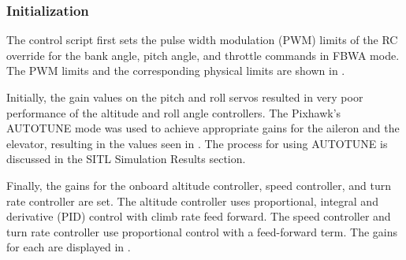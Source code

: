 \documentclass{aiaa}
\begin{document}
\subsubsection{Initialization}

The control script first sets the pulse width modulation (PWM) limits of the RC override for the bank angle, pitch angle, and throttle commands in FBWA mode. The PWM limits and the corresponding physical limits are shown in .


Initially, the gain values on the pitch and roll servos resulted in very poor performance of the altitude and roll angle controllers. The Pixhawk's AUTOTUNE mode was used to achieve appropriate gains for the aileron and the elevator, resulting in the values seen in . The process for using AUTOTUNE is discussed in the SITL Simulation Results section.



Finally, the gains for the onboard altitude controller, speed controller, and turn rate controller are set. The altitude controller uses proportional, integral and derivative (PID) control with climb rate feed forward. The speed controller and turn rate controller use proportional control with a feed-forward term. The gains for each are displayed in .
\end{document}
